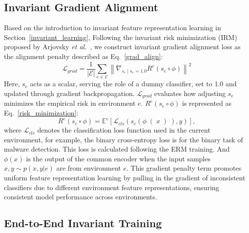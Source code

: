 \subsection{Invariant Gradient Alignment}
\label{gradient_alignment}
Based on the introduction to invariant feature representation learning in Section~\ref{invariant_learning}, Following the invariant risk minimization (IRM) proposed by Arjovsky \textit{et al.}~\cite{IRM_training}, we construct invariant gradient alignment loss as the alignment penalty described as Eq.~\ref{grad_align}:
\begin{equation}
\label{grad_align}
\mathcal{L}_{grad} = \frac{1}{|\mathcal{E}|} \sum_{e \in \mathcal{E}} \left\|\nabla_{s_{e} \mid s_{e}=1.0} R^{e}(s_e \circ \phi)\right\|^2
\end{equation}
Here, $s_{e}$ acts as a scalar, serving the role of a dummy classifier, set to 1.0 and updated through gradient backpropagation. $\mathcal{L}_{grad}$ evaluates how adjusting $s_e$ minimizes the empirical risk in environment $e$. $R^e(s_e \circ \phi)$ is represented as Eq.~\ref{risk_minimization}:
\begin{equation}
\label{risk_minimization}
R^{e}(s_{e} \circ \phi)=\mathbb{E}^{e}\left[\mathcal{L}_{cls} \left(s_{e}\left(\phi\right(x\left)\right), y\right)\right],
\end{equation}
where $\mathcal{L}_{cls}$ denotes the classification loss function used in the current environment, for example, the binary cross-entropy loss is for the binary task of malware detection. This loss is calculated following the ERM training. And $\phi(x)$ is the output of the common encoder when the input samples $x, y \sim p(x, y|e)$ are from environment $e$. This gradient penalty term promotes uniform feature representation learning by pulling in the gradient of inconsistent classifiers due to different environment feature representations, ensuring consistent model performance across environments.

\subsection{End-to-End Invariant Training}
\label{invariant training}
